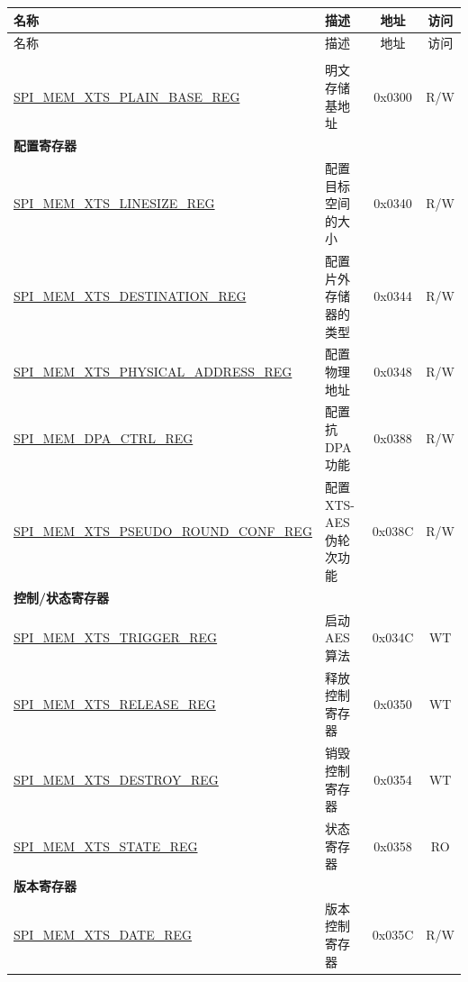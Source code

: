 \begin{longtable}{ | p{6.0cm} | p{6.6cm} | c | c| }
\hline\rowcolor{lightgray}
名称 & 描述 & 地址 & 访问 \\ \hline
\endfirsthead
\hline
\rowcolor{lightgray}
名称 & 描述 & 地址 & 访问  \\
\hline
\endhead
\endfoot

\multicolumn{4}{|l|}{\textbf{明文寄存器堆}} \\\hline
\hyperref[regdesc:SPIMEMXTSPLAINBASEREG]{SPI\_MEM\_XTS\_PLAIN\_BASE\_REG}  & 明文存储基地址   & 0x0300 & R/W \\\hline
\multicolumn{4}{|l|}{\textbf{配置寄存器}} \\ \hline
\hyperref[regdesc:SPIMEMXTSLINESIZEREG]{SPI\_MEM\_XTS\_LINESIZE\_REG}  & 配置目标空间的大小 & 0x0340 & R/W \\\hline
\hyperref[regdesc:SPIMEMXTSDESTINATIONREG]{SPI\_MEM\_XTS\_DESTINATION\_REG}  & 配置片外存储器的类型   & 0x0344 & R/W \\\hline
\hyperref[regdesc:SPIMEMXTSPHYSICALADDRESSREG]{SPI\_MEM\_XTS\_PHYSICAL\_ADDRESS\_REG}  & 配置物理地址   & 0x0348 & R/W \\\hline
\hyperref[regdesc:SPIMEMDPACTRLREG]{SPI\_MEM\_DPA\_CTRL\_REG}  & 配置抗 DPA 功能 & 0x0388 & R/W \\\hline
\hyperref[regdesc:SPIMEMXTSPSEUDOROUNDCONFREG]{SPI\_MEM\_XTS\_PSEUDO\_ROUND\_CONF\_REG} & 配置 XTS-AES 伪轮次功能 & 0x038C & R/W \\ \hline
\multicolumn{4}{|l|}{\textbf{控制/状态寄存器}} \\ \hline
\hyperref[regdesc:SPIMEMXTSTRIGGERREG]{SPI\_MEM\_XTS\_TRIGGER\_REG}  & 启动 AES 算法         & 0x034C & WT \\\hline
\hyperref[regdesc:SPIMEMXTSRELEASEREG]{SPI\_MEM\_XTS\_RELEASE\_REG}  & 释放控制寄存器         & 0x0350 & WT \\\hline
\hyperref[regdesc:SPIMEMXTSDESTROYREG]{SPI\_MEM\_XTS\_DESTROY\_REG}  & 销毁控制寄存器         & 0x0354 & WT \\\hline
\hyperref[regdesc:SPIMEMXTSSTATEREG]{SPI\_MEM\_XTS\_STATE\_REG}  & 状态寄存器       & 0x0358 & RO \\\hline
\multicolumn{4}{|l|}{\textbf{版本寄存器}} \\ \hline
\hyperref[regdesc:SPIMEMXTSDATEREG]{SPI\_MEM\_XTS\_DATE\_REG}  & 版本控制寄存器   & 0x035C & R/W \\\hline

\end{longtable}
